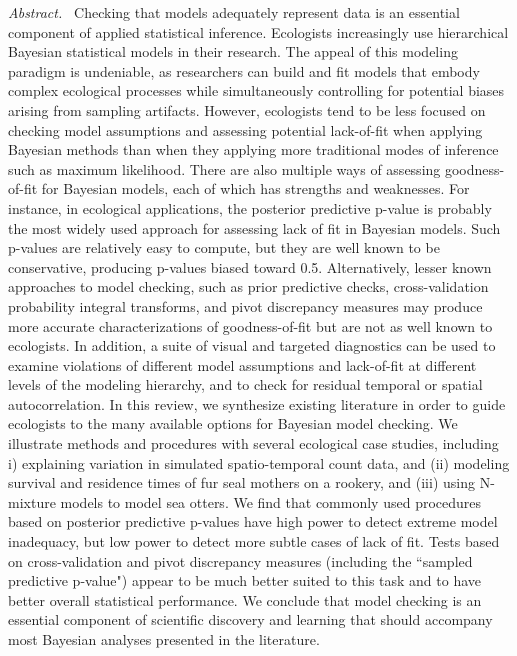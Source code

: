\documentclass[12pt,english]{article}
\begin{document}
\begin{spacing}{1.9}
{\em Abstract.\ }  Checking that models adequately represent data is
an essential component of applied statistical inference.  Ecologists
increasingly use hierarchical Bayesian statistical models in their
research.  The appeal of this modeling paradigm is undeniable, as
researchers can build and fit models that embody complex ecological
processes while simultaneously controlling for potential biases
arising from sampling artifacts. However, ecologists tend to be less
focused on checking model assumptions and assessing potential
lack-of-fit when applying Bayesian methods than when they applying
more traditional modes of inference such as maximum likelihood.  There
are also multiple ways of assessing goodness-of-fit for Bayesian
models, each of which has strengths and weaknesses.  For instance, in
ecological applications, the posterior predictive p-value is probably
the most widely used approach for assessing lack of fit in Bayesian
models. Such p-values are relatively easy to compute, but they are
well known to be conservative, producing p-values biased toward 0.5.
Alternatively, lesser known approaches to model checking, such as
prior predictive checks, cross-validation probability integral
transforms, and pivot discrepancy measures may produce more accurate
characterizations of goodness-of-fit but are not as well known to
ecologists.  In addition, a suite of visual and targeted diagnostics
can be used to examine violations of different model assumptions and
lack-of-fit at different levels of the modeling hierarchy, and to
check for residual temporal or spatial autocorrelation.  In this
review, we synthesize existing literature in order to guide ecologists
to the many available options for Bayesian model checking.  We
illustrate methods and procedures with several ecological case
studies, including i) explaining variation in simulated
spatio-temporal count data, and (ii) modeling survival and residence
times of fur seal mothers on a rookery, and (iii) using N-mixture
models to model sea otters.  We find that commonly used procedures based on posterior predictive p-values have high power to detect extreme model inadequacy, but low power to detect more subtle cases of lack of fit.  Tests based on cross-validation and pivot discrepancy measures (including the ``sampled predictive p-value") appear to be much better suited to this task and to have better overall statistical performance. We conclude that model checking is an essential component of scientific discovery and learning that should accompany most Bayesian analyses presented in the literature.



\end{spacing}
\end{document}
